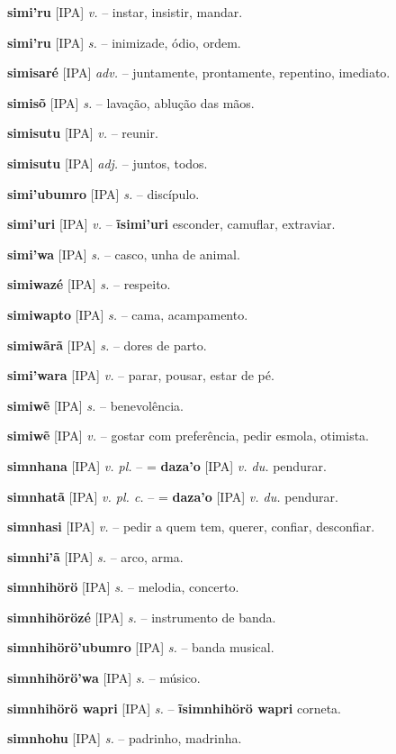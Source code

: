 \textbf{simi'ru} [IPA] \textit{v.} -- instar, insistir, mandar.

\textbf{simi'ru} [IPA] \textit{s.} -- inimizade, ódio, ordem.

\textbf{simisaré} [IPA] \textit{adv.} -- juntamente, prontamente, repentino, imediato.

\textbf{simisõ} [IPA] \textit{s.} -- lavação, ablução das mãos.

\textbf{simisutu} [IPA] \textit{v.} -- reunir.

\textbf{simisutu} [IPA] \textit{adj.} -- juntos, todos.

\textbf{simi'ubumro} [IPA] \textit{s.} -- discípulo.

\textbf{simi'uri} [IPA] \textit{v.} -- \textbf{ĩsimi'uri} esconder, camuflar, extraviar.

\textbf{simi'wa} [IPA] \textit{s.} -- casco, unha de animal.

\textbf{simiwazé} [IPA] \textit{s.} -- respeito.

\textbf{simiwapto} [IPA] \textit{s.} -- cama, acampamento.

\textbf{simiwãrã} [IPA] \textit{s.} -- dores de parto.

\textbf{simi'wara} [IPA] \textit{v.} -- parar, pousar, estar de pé.

\textbf{simiwẽ} [IPA] \textit{s.} -- benevolência.

\textbf{simiwẽ} [IPA] \textit{v.} -- gostar com preferência, pedir esmola, otimista.

\textbf{simnhana} [IPA] \textit{v. pl.} -- = \textbf{daza'o} [IPA] \textit{v. du.} pendurar.

\textbf{simnhatã} [IPA] \textit{v. pl. c.} -- = \textbf{daza'o} [IPA] \textit{v. du.} pendurar.

\textbf{simnhasi} [IPA] \textit{v.} -- pedir a quem tem, querer, confiar, desconfiar.

\textbf{simnhi'ã} [IPA] \textit{s.} -- arco, arma.

\textbf{simnhihörö} [IPA] \textit{s.} -- melodia, concerto.

\textbf{simnhihörözé} [IPA] \textit{s.} -- instrumento de banda.

\textbf{simnhihörö'ubumro} [IPA] \textit{s.} -- banda musical.

\textbf{simnhihörö'wa} [IPA] \textit{s.} -- músico.

\textbf{simnhihörö wapri} [IPA] \textit{s.} -- \textbf{ĩsimnhihörö wapri} corneta.

\textbf{simnhohu} [IPA] \textit{s.} -- padrinho, madrinha.

